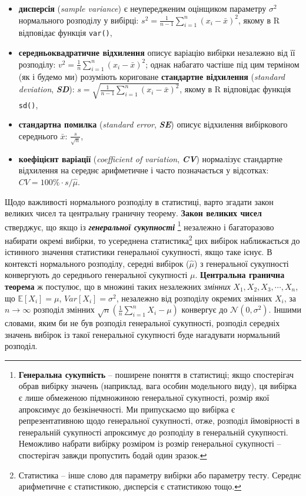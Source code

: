 \documentclass[
  11pt,
]{book}
\begin{document}
\begin{itemize}
\item
  \textbf{дисперсія} (\emph{sample variance}) є неупередженим оцінщиком параметру \(\sigma^2\) нормального розподілу у вибірці: \(s^2 = \frac{1}{n-1} \sum \limits_{i=1}^n (x_i - \bar{x})^2\), якому в R відповідає функція \texttt{var()},
\item
  \textbf{середньоквадратичне відхилення} описує варіацію вибірки незалежно від її розподілу: \(v^2 = \frac{1}{n} \sum \limits_{i=1}^n (x_i - \bar{x})^2\); однак набагато частіше під цим терміном (як і будемо ми) розуміють кориговане \textbf{стандартне відхилення} (\emph{standard deviation}, \textbf{\emph{SD}}): \(s = \sqrt{\frac{1}{n-1} \sum \limits_{i=1}^n (x_i - \bar{x})^2}\), якому в R відповідає функція \texttt{sd()},
\item
  \textbf{стандартна помилка} (\emph{standard error}, \textbf{\emph{SE}}) описує відхилення вибіркового середнього \(\bar{x}\): \(\frac{s}{\sqrt{n}}\),
\item
  \textbf{коефіцієнт варіації} (\emph{coefficient of variation}, \textbf{\emph{CV}}) нормалізує стандартне відхилення на середнє арифметичне і часто позначається у відсотках: \(CV = 100 \% \cdot {s}/{\hat{\mu}}\).
\end{itemize}

Щодо важливості нормального розподілу в статистиці, варто згадати закон великих чисел та центральну граничну теорему. \textbf{Закон великих чисел} стверджує, що якщо із \textbf{\emph{генеральної сукупності}} \footnote{\textbf{Генеральна сукупність} -- поширене поняття в статистиці; якщо спостерігач обрав вибірку значень (наприклад, вага особин модельного виду), ця вибірка є лише обмеженою підмножиною генеральної сукупності, розмір якої апроксимує до безкінечності. Ми припускаємо що вибірка є репрезентативною щодо генеральної сукупності, отже, розподіл ймовірності в генеральній сукупності апроксимує до розподілу в генеральній сукупності. Неможливо набрати вибірку розміром із розмір генеральної сукупності -- спостерігач завжди пропустить бодай один зразок.} незалежно і багаторазово набирати окремі вибірки, то усереднена статистика\footnote{Статистика -- інше слово для параметру вибірки або параметру тесту. Середнє арифметичне є статистикою, дисперсія є статистикою тощо.} цих вибірок наближається до істинного значення статистики генеральної сукупності, якщо таке існує. В контексті нормального розподілу, середні вибірок (\(\hat{\mu}\)) з генеральної сукупності конвергують до середнього генеральної сукупності \(\mu\). \textbf{Центральна гранична теорема} ж постулює, що в множині таких незалежних \emph{змінних} \(X_1, X_2, X_3, \cdots, X_n\), що \(\mathbb{E} [X_i] = \mu\), \(Var[X_i] = \sigma^2\), незалежно від розподілу окремих змінних \(X_i\), за \(n \rightarrow \infty\) розподіл змінних \(\sqrt{n} (\frac{1}{n}\sum \limits_{i=1}^n X_i - \mu)\) конвергує до \(\mathcal{N}(0,  \sigma^2)\). Іншими словами, яким би не був розподіл генеральної сукупності, розподіл середніх значень вибірок із такої генеральної сукупності буде нагадувати нормальний розподіл.
\end{document}
